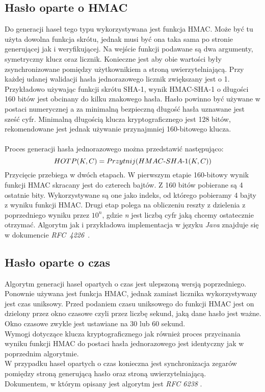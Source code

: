 \subsection{Hasło oparte o HMAC}
Do generacji haseł tego typu wykorzystywana jest funkcja HMAC. Może być tu użyta dowolna funkcja skrótu, jednak 
musi być ona taka sama po stronie generującej jak i weryfikującej. 
Na wejście funkcji podawane są dwa argumenty, symetryczny klucz oraz licznik. 
Konieczne jest aby obie wartości były zsynchronizowane pomiędzy użytkownikiem a stroną uwierzytelniającą. 
Przy każdej udanej walidacji hasła jednorazowego licznik zwiększany jest o 1. \\
Przykładowo używając funkcji skrótu SHA-1, wynik HMAC-SHA-1 o długości 160 bitów jest obcinany do kilku znakowego hasła. 
Hasło powinno być używane w postaci numerycznej a za minimalną bezpieczną długość hasła uznawane jest sześć cyfr.
Minimalną długością klucza kryptograficznego jest 128 bitów, rekomendowane jest jednak używanie przynajmniej 160-bitowego 
klucza. \\ \\
Proces generacji hasła jednorazowego można przedstawić następująco: \\
$$HOTP(K, C) = Przytnij(\mathop{\mbox{$HMAC$-$SHA$-$1$}}(K, C))$$
Przycięcie przebiega w dwóch etapach. W pierwszym etapie 160-bitowy wynik funkcji HMAC skracany jest do czterech bajtów.
Z 160 bitów pobierane są 4 ostatnie bity. 
Wykorzystywane są one jako indeks, od którego pobieramy 4 bajty z wyniku funkcji HMAC.
Drugi etap polega na obliczeniu reszty z dzielenia z poprzedniego wyniku przez $10^n$, gdzie \textit{n} jest 
liczbą cyfr jaką chcemy ostatecznie otrzymać. Algorytm jak i przykładowa implementacja w języku \textit{Java} znajduje się w dokumencie \textit{RFC~4226}~\cite{hotprfc}.

\subsection{Hasło oparte o czas}
Algorytm generacji haseł opartych o czas jest ulepszoną wersją poprzedniego. 
Ponownie używana jest funkcja HMAC, jednak zamiast licznika wykorzystywany jest czas uniksowy.
Przed podaniem czasu uniksowego do funkcji HMAC jest on dzielony przez okno czasowe czyli 
przez liczbę sekund, jaką dane hasło jest ważne. 
Okno czasowe zwykle jest ustawiane na 30 lub 60 sekund. \\
Wymogi dotyczące klucza kryptograficznego jak również proces przycinania wyniku funkcji HMAC 
do postaci hasła jednorazowego jest identyczny jak w poprzednim algorytmie. \\
W przypadku haseł opartych o czas konieczna jest synchronizacja zegarów pomiędzy stroną generującą hasło
oraz stroną uwierzytelniającą. \\
Dokumentem, w którym opisany jest algorytm jest \textit{RFC 6238} \cite{totprfc}.

